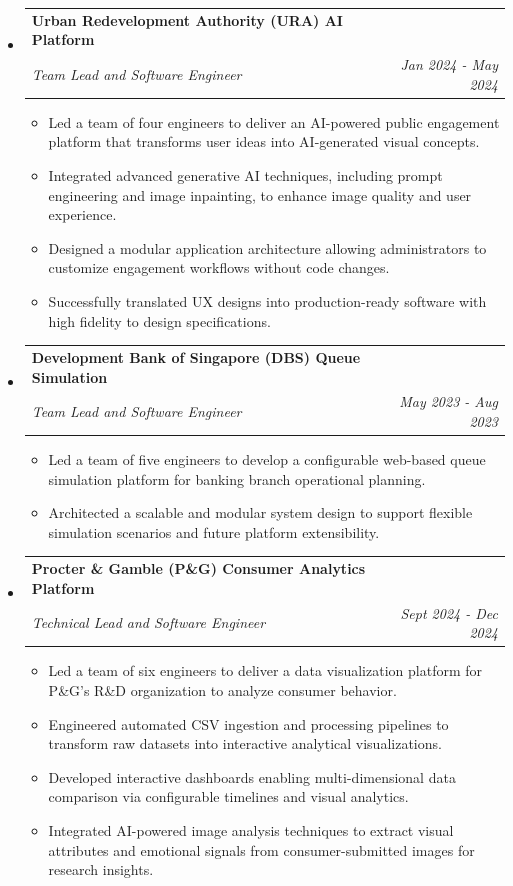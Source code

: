 \documentclass[letterpaper,11pt]{article}
\makeatletter
\newcommand{\resitem}[1]{\item #1 \vspace{-2pt}}
\newcommand{\ressubheading}[4]{
    \begin{tabular*}{6.5in}{p{4.8in}@{\extracolsep{\fill}}r}
            \textbf{#1} & #2 \\
            \textit{#3} & \textit{#4} \\
    \end{tabular*}\vspace{-8pt}}
\makeatother
\begin{document}
      \begin{itemize}
        \item \ressubheading{Urban Redevelopment Authority (URA) AI Platform}{}{Team Lead and Software Engineer}{Jan 2024 - May 2024}
        \begin{itemize}
            \resitem{Led a team of four engineers to deliver an AI-powered public engagement platform that transforms user ideas into AI-generated visual concepts.}
            \resitem{Integrated advanced generative AI techniques, including prompt engineering and image inpainting, to enhance image quality and user experience.}
            \resitem{Designed a modular application architecture allowing administrators to customize engagement workflows without code changes.}
            \resitem{Successfully translated UX designs into production-ready software with high fidelity to design specifications.}
        \end{itemize}
        \item \ressubheading{Development Bank of Singapore (DBS) Queue Simulation}{}{Team Lead and Software Engineer}{May 2023 - Aug 2023}
        \begin{itemize}
            \resitem{Led a team of five engineers to develop a configurable web-based queue simulation platform for banking branch operational planning.}
            \resitem{Architected a scalable and modular system design to support flexible simulation scenarios and future platform extensibility.}
        \end{itemize}
        \item \ressubheading{Procter \& Gamble (P\&G) Consumer Analytics Platform}{}{Technical Lead and Software Engineer}{Sept 2024 - Dec 2024}
        \begin{itemize}
            \resitem{Led a team of six engineers to deliver a data visualization platform for P\&G's R\&D organization to analyze consumer behavior.}
            \resitem{Engineered automated CSV ingestion and processing pipelines to transform raw datasets into interactive analytical visualizations.}
            \resitem{Developed interactive dashboards enabling multi-dimensional data comparison via configurable timelines and visual analytics.}
            \resitem{Integrated AI-powered image analysis techniques to extract visual attributes and emotional signals from consumer-submitted images for research insights.}
        \end{itemize}
      \end{itemize}
\end{document}
